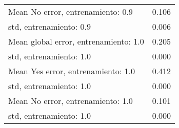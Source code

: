 \begin{longtable}{p{4cm}|p{1.5cm}}
Mean No error, entrenamiento: 0.9     &        0.106 \\
std, entrenamiento: 0.9               &        0.006 \\
Mean global error, entrenamiento: 1.0 &        0.205 \\
std, entrenamiento: 1.0               &        0.000 \\
Mean Yes error, entrenamiento: 1.0    &        0.412 \\
std, entrenamiento: 1.0               &        0.000 \\
Mean No error, entrenamiento: 1.0     &        0.101 \\
std, entrenamiento: 1.0               &        0.000 \\
\end{longtable}
